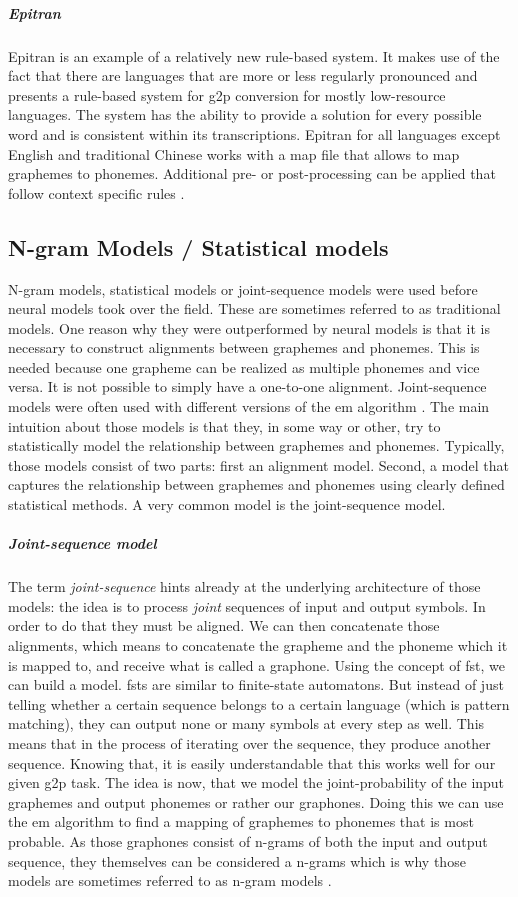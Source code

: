 \subparagraph{Epitran} Epitran is an example of a relatively new rule-based system. It makes use of the fact that there are languages that are more or less regularly pronounced and presents a rule-based system for \ac{g2p} conversion for mostly low-resource languages. The system has the ability to provide a solution for every possible word and is consistent within its transcriptions. Epitran for all languages except English and traditional Chinese works with a map file that allows to map graphemes to phonemes. Additional pre- or post-processing can be applied that follow context specific rules \citep{mortensen-etal-2018-epitran}.


\subsection{N-gram Models / Statistical models}
N-gram models, statistical models or joint-sequence models were used before neural models took over the field. These are sometimes referred to as traditional models. One reason why they were outperformed by neural models is that it is necessary to construct alignments between graphemes and phonemes. This is needed because one grapheme can be realized as multiple phonemes and vice versa. It is not possible to simply have a one-to-one alignment. Joint-sequence models were often used with different versions of the \acf{em} algorithm \citep{lo-nicolai-2021-linguistic}. The main intuition about those models is that they, in some way or other, try to statistically model the relationship between graphemes and phonemes. Typically, those models consist of two parts: first an alignment model. Second, a model that captures the relationship between graphemes and phonemes using clearly defined statistical methods. A very common model is the joint-sequence model.

\subparagraph{Joint-sequence model} The term \textit{joint-sequence} hints already at the underlying architecture of those models: the idea is to process \textit{joint} sequences of input and output symbols. In order to do that they must be aligned. We can then concatenate those alignments, which means to concatenate the grapheme and the phoneme which it is mapped to, and receive what is called a graphone. Using the concept of \ac{fst}, we can build a model. \acp{fst} are similar to finite-state automatons. But instead of just telling whether a certain sequence belongs to a certain language (which is pattern matching), they can output none or many symbols at every step as well. This means that in the process of iterating over the sequence, they produce another sequence. Knowing that, it is easily understandable that this works well for our given \ac{g2p} task. The idea is now, that we model the joint-probability of the input graphemes and output phonemes or rather our graphones. Doing this we can use the \ac{em} algorithm to find a mapping of graphemes to phonemes that is most probable. As those graphones consist of n-grams of both the input and output sequence, they themselves can be considered a n-grams which is why those models are sometimes referred to as n-gram models \citep{ney-joint-sequence2008, lo-nicolai-2021-linguistic}.

